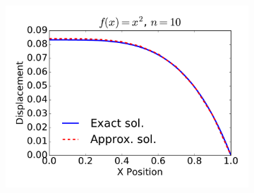 \documentclass{article}
\begin{document}
\begin{figure}
\begin{subfigure}[b]{0.33\textwidth}
                \label{fig:gull2}
        \end{subfigure}%
        \begin{subfigure}[b]{0.33\textwidth}
                \includegraphics[width=\linewidth]{displacement_func2_Nell10}
                \label{fig:tiger}
        \end{subfigure}%
        

\end{figure}
\end{document}

